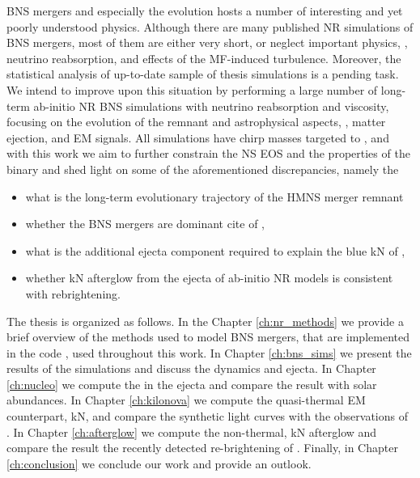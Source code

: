 \ac{BNS} mergers and especially the \pmerg{} evolution hosts a number of interesting 
and yet poorly understood physics. Although there are many published \ac{NR} simulations of \ac{BNS} mergers, 
most of them are either very short, or neglect important physics, \eg, neutrino reabsorption, 
and effects of the \ac{MF}-induced turbulence. 
Moreover, the statistical analysis of up-to-date sample of thesis 
simulations is a pending task.
%
We intend to improve upon this situation by performing a large number of long-term ab-initio 
\ac{NR} \ac{BNS} simulations with neutrino reabsorption and viscosity, focusing on the 
\pmerg{} evolution of the remnant and astrophysical aspects, \ie, matter ejection, 
\rproc{} \nuc{} and \ac{EM} signals.
%
All simulations have chirp masses targeted to \GW{}, and with this work we aim to further 
constrain the \ac{NS} \ac{EOS} and the properties of the binary and shed light on 
some of the aforementioned discrepancies, namely the 
\begin{itemize}
    \item what is the long-term evolutionary trajectory of the \ac{HMNS} merger remnant
    \item whether the \ac{BNS} mergers are dominant cite of \rproc{}, 
    \item what is the additional ejecta component required to explain the blue \ac{kN} of \AT{}, 
    \item whether \ac{kN} afterglow from the ejecta of ab-initio \ac{NR} models is consistent with \GRB{} rebrightening.
\end{itemize}

The thesis is organized as follows.
In the Chapter \ref{ch:nr_methods} we provide a brief overview of the methods used to model  \ac{BNS} mergers, 
that are implemented in the code \wisky{}, used throughout this work.
In Chapter \ref{ch:bns_sims} we present the results of the simulations and discuss the \pmerg{} dynamics and ejecta.
In Chapter \ref{ch:nucleo} we compute the \rproc{} \nuc{} in the ejecta and compare the result with 
solar abundances.
In Chapter \ref{ch:kilonova} we compute the quasi-thermal \ac{EM} counterpart, \ac{kN}, and compare 
the synthetic light curves with the observations of \AT{}.
In Chapter \ref{ch:afterglow} we compute the non-thermal, \ac{kN} afterglow and compare the 
result the recently detected re-brightening of \GRB{}.
Finally, in Chapter \ref{ch:conclusion} we conclude our work and provide an outlook.